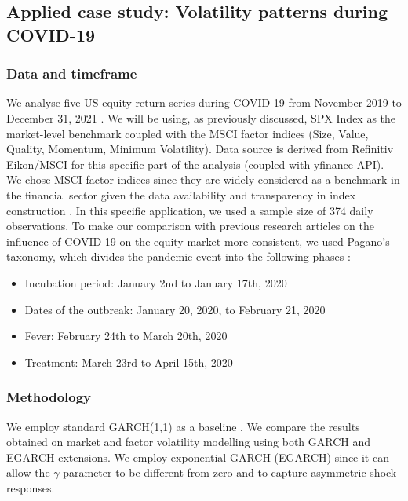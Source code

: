 \documentclass{article}
\begin{document}
\newpage



\subsection{Applied case study: Volatility patterns during COVID-19}

\subsubsection{Data and timeframe}
We analyse five US equity return series during COVID-19 from November 2019 to December 31, 2021 \cite{hasaj2021}. We will be using, as previously discussed, SPX Index as the market-level benchmark coupled with the MSCI factor indices (Size, Value, Quality, Momentum, Minimum Volatility). Data source is derived from Refinitiv Eikon/MSCI for this specific part of the analysis (coupled with yfinance API). We chose MSCI factor indices since they are widely considered as a benchmark in the financial sector given the data availability and transparency in index construction \cite{hasaj2021}. In this specific application, we used a sample size of 374 daily observations.
To make our comparison with previous research articles on the influence of COVID-19 on the equity market more consistent, we used Pagano's \cite{pagano2020} taxonomy, which divides the pandemic event into the following phases \cite{hasaj2021}:\newline

\begin{itemize}
    \item Incubation period: January 2nd to January 17th, 2020
    \item Dates of the outbreak: January 20, 2020, to February 21, 2020
    \item Fever: February 24th to March 20th, 2020
    \item Treatment: March 23rd to April 15th, 2020
\end{itemize}

\subsubsection{Methodology}

We employ standard GARCH(1,1) as a baseline \cite{nelson1991}. We compare the results obtained on market and factor volatility modelling using both GARCH and EGARCH extensions. We employ exponential GARCH (EGARCH) \cite{nelson1991} since it can allow the $\gamma$ parameter to be different from zero and to capture asymmetric shock responses.\newline
\end{document}
